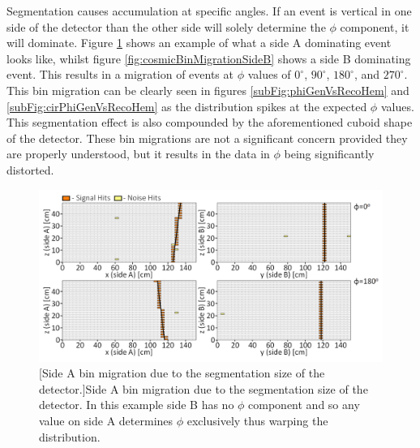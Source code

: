 Segmentation causes accumulation at specific angles. If an event is vertical in one side of the detector than the other side will solely determine the $\phi$ component, it will dominate. Figure  \ref{fig:cosmicBinMigrationSideA} shows an example of what a side A dominating event looks like, whilst figure \ref{fig:cosmicBinMigrationSideB} shows a side B dominating event. This results in a migration of events at $\phi$ values of $0^\circ$, $90^\circ$, $180^\circ$, and $270^\circ$. This bin migration can be clearly seen in figures \ref{subFig:phiGenVsRecoHem} and \ref{subFig:cirPhiGenVsRecoHem} as the distribution spikes at the expected $\phi$ values. This segmentation effect is also compounded by the aforementioned cuboid shape of the detector. These bin migrations are not a significant concern provided they are properly understood, but it results in the data in $\phi$ being significantly distorted.  
 
\begin{figure}[!h]
 \centering
 \includegraphics[width=\linewidth]{Chapter6/Figs/Raster/phiSideABinMigrationMedText.png}
 [Side A bin migration due to the segmentation size of the detector.]{Side A bin migration due to the segmentation size of the detector. In this example side B has no $\phi$ component and so any value on side A determines $\phi$ exclusively thus warping the distribution.} 
 \label{fig:cosmicBinMigrationSideA}
\end{figure}

